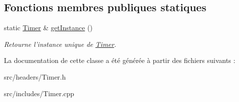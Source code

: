 \subsection*{Fonctions membres publiques statiques}
\begin{DoxyCompactItemize}
\item 
\hypertarget{classTimer_a8357f90f20707f9693fc713319de923a}{static \hyperlink{classTimer}{Timer} \& \hyperlink{classTimer_a8357f90f20707f9693fc713319de923a}{get\-Instance} ()}\label{classTimer_a8357f90f20707f9693fc713319de923a}

\begin{DoxyCompactList}\small\item\em Retourne l'instance unique de \hyperlink{classTimer}{Timer}. \end{DoxyCompactList}\end{DoxyCompactItemize}


La documentation de cette classe a été générée à partir des fichiers suivants \-:\begin{DoxyCompactItemize}
\item 
src/headers/Timer.\-h\item 
src/includes/Timer.\-cpp\end{DoxyCompactItemize}
